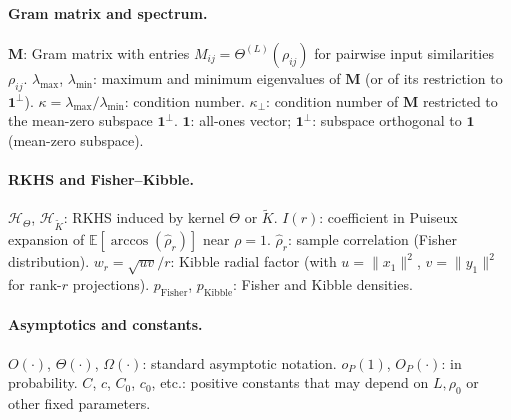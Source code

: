 \paragraph{Gram matrix and spectrum.}
\(\mathbf{M}\): Gram matrix with entries \(M_{ij}=\Theta^{(L)}(\rho_{ij})\) for pairwise input similarities \(\rho_{ij}\). \quad \(\lambda_{\max}\), \(\lambda_{\min}\): maximum and minimum eigenvalues of \(\mathbf{M}\) (or of its restriction to \(\mathbf{1}^\perp\)). \quad \(\kappa=\lambda_{\max}/\lambda_{\min}\): condition number. \quad \(\kappa_\perp\): condition number of \(\mathbf{M}\) restricted to the mean-zero subspace \(\mathbf{1}^\perp\). \quad \(\mathbf{1}\): all-ones vector; \(\mathbf{1}^\perp\): subspace orthogonal to \(\mathbf{1}\) (mean-zero subspace).

\paragraph{RKHS and Fisher--Kibble.}
\(\mathcal{H}_\Theta\), \(\mathcal{H}_{\tilde{K}}\): RKHS induced by kernel \(\Theta\) or \(\tilde{K}\). \quad \(I(r)\): coefficient in Puiseux expansion of \(\mathbb{E}[\arccos(\hat{\rho}_r)]\) near \(\rho=1\). \quad \(\hat{\rho}_r\): sample correlation (Fisher distribution). \quad \(w_r=\sqrt{uv}/r\): Kibble radial factor (with \(u=\|x_1\|^2\), \(v=\|y_1\|^2\) for rank-\(r\) projections). \quad \(p_{\mathrm{Fisher}}\), \(p_{\mathrm{Kibble}}\): Fisher and Kibble densities.

\paragraph{Asymptotics and constants.}
\(O(\cdot)\), \(\Theta(\cdot)\), \(\Omega(\cdot)\): standard asymptotic notation. \quad \(o_P(1)\), \(O_P(\cdot)\): in probability. \quad \(C\), \(c\), \(C_0\), \(c_0\), etc.: positive constants that may depend on \(L,\rho_0\) or other fixed parameters.


